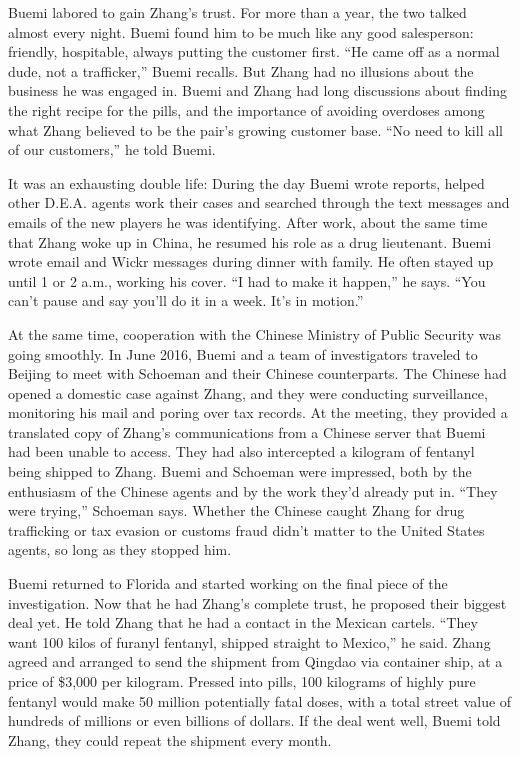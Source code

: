Buemi labored to gain Zhang's trust. For more than a year, the two
talked almost every night. Buemi found him to be much like any good
salesperson: friendly, hospitable, always putting the customer first.
``He came off as a normal dude, not a trafficker,'' Buemi recalls. But
Zhang had no illusions about the business he was engaged in. Buemi and
Zhang had long discussions about finding the right recipe for the pills,
and the importance of avoiding overdoses among what Zhang believed to be
the pair's growing customer base. ``No need to kill all of our
customers,'' he told Buemi.

It was an exhausting double life: During the day Buemi wrote reports,
helped other D.E.A. agents work their cases and searched through the
text messages and emails of the new players he was identifying. After
work, about the same time that Zhang woke up in China, he resumed his
role as a drug lieutenant. Buemi wrote email and Wickr messages during
dinner with family. He often stayed up until 1 or 2 a.m., working his
cover. ``I had to make it happen,'' he says. ``You can't pause and say
you'll do it in a week. It's in motion.''

At the same time, cooperation with the Chinese Ministry of Public
Security was going smoothly. In June 2016, Buemi and a team of
investigators traveled to Beijing to meet with Schoeman and their
Chinese counterparts. The Chinese had opened a domestic case against
Zhang, and they were conducting surveillance, monitoring his mail and
poring over tax records. At the meeting, they provided a translated copy
of Zhang's communications from a Chinese server that Buemi had been
unable to access. They had also intercepted a kilogram of fentanyl being
shipped to Zhang. Buemi and Schoeman were impressed, both by the
enthusiasm of the Chinese agents and by the work they'd already put in.
``They were trying,'' Schoeman says. Whether the Chinese caught Zhang
for drug trafficking or tax evasion or customs fraud didn't matter to
the United States agents, so long as they stopped him.

Buemi returned to Florida and started working on the final piece of the
investigation. Now that he had Zhang's complete trust, he proposed their
biggest deal yet. He told Zhang that he had a contact in the Mexican
cartels. ``They want 100 kilos of furanyl fentanyl, shipped straight to
Mexico,'' he said. Zhang agreed and arranged to send the shipment from
Qingdao via container ship, at a price of \$3,000 per kilogram. Pressed
into pills, 100 kilograms of highly pure fentanyl would make 50 million
potentially fatal doses, with a total street value of hundreds of
millions or even billions of dollars. If the deal went well, Buemi told
Zhang, they could repeat the shipment every month.

